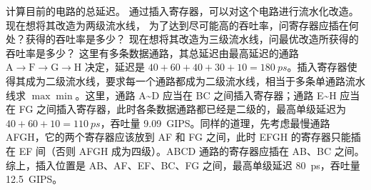 \begin{problems}
\begin{figure}[H]
        \end{figure}
        \qn 计算目前的电路的总延迟。
        \qn 通过插入寄存器，可以对这个电路进行流水化改造。现在想将其改造为两级流水线， 为了达到尽可能高的吞吐率，问寄存器应插在何处？获得的吞吐率是多少？
        \qn 现在想将其改造为三级流水线，问最优改造所获得的吞吐率是多少？
        \sol 这里有多条数据通路，其总延迟由最高延迟的通路 $\mathrm A \to \mathrm F \to \mathrm G \to \mathrm H$ 决定，延迟是 $40+60+40+30+10 = \SI{180}{ps}$。插入寄存器使得其成为二级流水线，要求每一个通路都成为二级流水线，相当于多条单通路流水线求 $\max \min$。这里，通路 A\textasciitilde D 应当在 BC 之间插入寄存器；通路 E\textasciitilde H 应当在 FG 之间插入寄存器，此时各条数据通路都已经是二级的，最高单级延迟为 $40+60+10 = \SI{110}{ps}$，吞吐量 \SI{9.09}{GIPS}。同样的道理，先考虑最慢通路 AFGH，它的两个寄存器应该放到 AF 和 FG 之间，此时 EFGH 的寄存器只能插在 EF 间（否则 AFGH 成为四级）。ABCD 通路的寄存器应插在 AB、BC 之间。综上，插入位置是 AB、AF、EF、BC、FG 之间，最高单级延迟 \SI{80}{ps}，吞吐量 \SI{12.5}{GIPS}。
    \end{problems}

